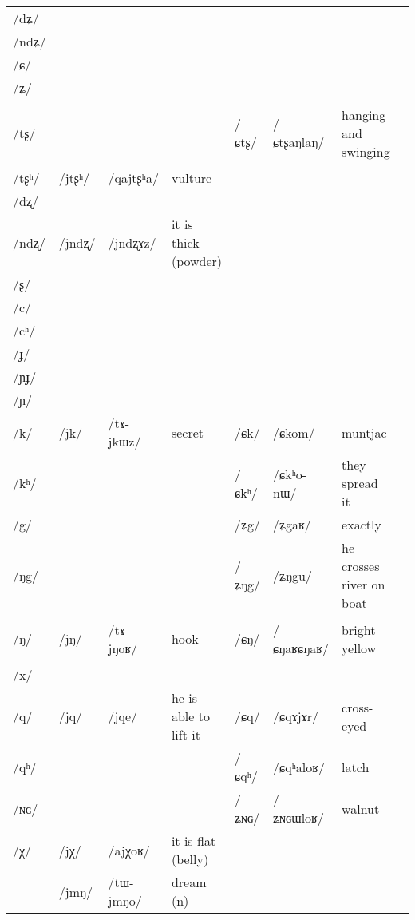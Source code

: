 \documentclass[oneside,a4paper,11pt]{article}
\newcommand{\ipa}[1]{\mbox{\phon/#1/}}
\newcommand{\deux}[1]{\ipa{#1}\addtocounter{2clusters}{1}}
\newcommand{\trois}[1]{\ipa{#1}\addtocounter{3clusters}{1}}
\newcommand{\idph}[1]{\cellcolor{gray}\textbf{#1}}
\begin{document}
\begin{table}
{\begin{tabular}{l|lll|lll|l}
\ipa{dʑ}  & 	  & 	  & 	  & 	  & 	  & 	  & 	\\
\ipa{ndʑ}  & 	  & 	  & 	  & 	  & 	  & 	  & 	\\
\ipa{ɕ}  & 	  & 	  & 	  & 	  & 	  & 	  & 	\\
\ipa{ʑ}  & 	  & 	  & 	  & 	  & 	  & 	  & 	\\
\ipa{tʂ}  & 	  & 	  & 	  & 	 \deux{ɕtʂ} \idph{}  & 	 \ipa{ɕtʂaŋlaŋ}  & 	 hanging and swinging & 	\\
\ipa{tʂʰ}  & 	 \deux{jtʂʰ}  & 	 \ipa{qajtʂʰa}  & 	vulture  & 	  & 	  & 	  & 	\\
\ipa{dʐ}  & 	  & 	  & 	  & 	  & 	  & 	  & 	\\
\ipa{ndʐ}  & 	 \deux{jndʐ}  & 	 \ipa{jndʐɤz}  & 	it is thick (powder)  & 	  & 	  & 	  & 	\\
\ipa{ʂ}  & 	  & 	  & 	  & 	  & 	  & 	  & 	\\
\ipa{c}  & 	  & 	  & 	  & 	  & 	  & 	  & 	\\
\ipa{cʰ}  & 	  & 	  & 	  & 	  & 	  & 	  & 	\\
\ipa{ɟ}  & 	  & 	  & 	  & 	  & 	  & 	  & 	\\
\ipa{ɲɟ}  & 	  & 	  & 	  & 	  & 	  & 	  & 	\\
\ipa{ɲ}  & 	  & 	  & 	  & 	  & 	  & 	  & 	\\
\ipa{k}  &	 \deux{jk}  &	 \ipa{tɤ-jkɯz}  &	 secret  &	 \deux{ɕk}  &	 \ipa{ɕkom}  &	 muntjac  &	\\
\ipa{kʰ}  &	  &	  &	  &	 \deux{ɕkʰ}  &	 \ipa{ɕkʰo-nɯ}  &	 they spread it  &	\\
\ipa{g}  &	  &	  &	  &	 \deux{ʑg}  &	 \ipa{ʑgaʁ}  &	 exactly  &	\\
\ipa{ŋg}  &	  &	  &	  &	 \deux{ʑŋg}  &	 \ipa{ʑŋgu}  &	 he crosses river on boat  &	\\
\ipa{ŋ}  &	 \deux{jŋ}  &	 \ipa{tɤ-jŋoʁ}  &	 hook  &	 \deux{ɕŋ} \idph{}  &	 \ipa{ɕŋaʁɕŋaʁ}  &	 bright yellow  &	\\
\ipa{x}  &	  &	  &	  &	  &	  &	  &	\\
\ipa{q}  &	 \deux{jq}  &	 \ipa{jqe}  &	 he is able to lift it  &	 \deux{ɕq}  &	 \ipa{ɕqɤjɤr}  &	 cross-eyed  &	\\
\ipa{qʰ}  &	  &	  &	  &	 \deux{ɕqʰ}  &	 \ipa{ɕqʰaloʁ}  &	 latch  &	\\
\ipa{ɴɢ}  &	  &	  &	  &	 \deux{ʑɴɢ}  &	 \ipa{ʑɴɢɯloʁ}  &	 walnut  &	\\
\ipa{χ}  &	 \deux{jχ}  &	 \ipa{ajχoʁ}  &	 it is flat (belly)  &	  &	  &	  &	\\
\midrule  					 
 &\trois{jmŋ} & \ipa{tɯ-jmŋo} &dream (n) \\  
  \end{tabular}}
\end{table}
\end{document}
